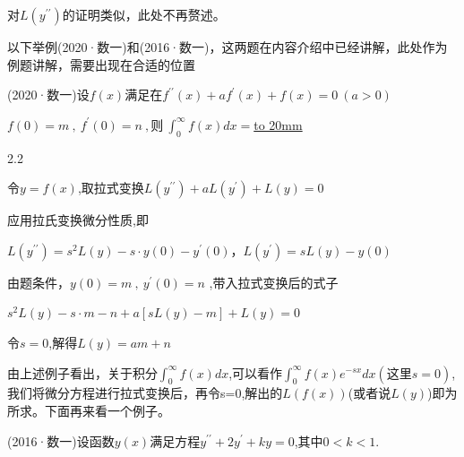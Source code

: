 \vspace{-20pt}

\hspace{3cm}对$L\left(y^{\prime\prime}\right)$的证明类似，此处不再赘述。

以下举例(2020·数一)和(2016·数一)，这两题在内容介绍中已经讲解，此处作为例题讲解，需要出现在合适的位置

\vspace{10pt}

 \hspace{0.5em} (2020·数一)设$f(x)$满足在$f^{\prime\prime}\left(x\right)+af^{\prime}\left(x\right)+f\left(x\right)=0\:\left(a>0\right)$

\hspace{3.5em}$f\left(0\right)=m\:,\:f^{\prime}\left(0\right)=n\:,则\:\int_{0}^{\infty}f\left(x\right)dx=$\underline{\hbox to 20mm{}}

\vspace{-10pt}

\begin{spacing}{2.2}
	\begin{center}
		
		 \hspace{0.5em} 令$y=f(x)$,取拉式变换\hspace{1em}$L\left(y^{\prime\prime}\right)+aL\left(y^{\prime}\right)+L\left(y\right)=0$
		
		应用拉氏变换微分性质,即
		
		$L\left(y^{\prime\prime}\right)=s^{2}L\left(y\right)-s\cdot y\left(0\right)-y^{\prime}\left(0\right)$，$L\left(y^{\prime}\right)=sL\left(y\right)-y\left(0\right)$
		
		由题条件，$y\left(0\right)=m\:,\:y^{\prime}\left(0\right)=n$ ,带入拉式变换后的式子
		
		$s^{2}L\left(y\right)-s\cdot m-n+a\left\lbrack sL\left(y\right)-m\right\rbrack+L\left(y\right)=0$
		
		令$s=0$,解得$L(y)=am+n$
	\end{center}
\end{spacing}



由上述例子看出，关于积分$\int_{0}^{\infty}f\left(x\right)dx$,可以看作$\int_{0}^{\infty}f\left(x\right)e^{-sx}dx (这里s=0)$,我们将微分方程进行拉式变换后，再令s=0,解出的$L(f(x))$(或者说$L(y)$)即为所求。下面再来看一个例子。

\vspace{10pt}

 \hspace{0.2em} (2016·数一)设函数$y(x)$满足方程$y^{\prime\prime}+2y^{\prime}+ky=0$,其中$0<k<1$.

